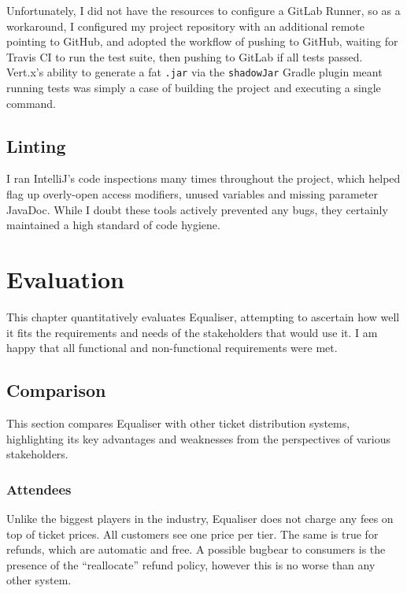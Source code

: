 \documentclass[12pt,a4paper]{bhamdissertation}
\newcommand{\code}[1]{\texttt{#1}}
\begin{document}
Unfortunately, I did not have the resources to configure a GitLab Runner, so as a workaround, I configured my project repository with an additional remote pointing to GitHub, and adopted the workflow of pushing to GitHub, waiting for Travis CI to run the test suite, then pushing to GitLab if all tests passed. Vert.x's ability to generate a fat \code{.jar} via the \code{shadowJar} Gradle plugin meant running tests was simply a case of building the project and executing a single command.

\section{Linting}

I ran IntelliJ's code inspections many times throughout the project, which helped flag up overly-open access modifiers, unused variables and missing parameter JavaDoc. While I doubt these tools actively prevented any bugs, they certainly maintained a high standard of code hygiene.

\chapter{Evaluation} \label{evaluation}

This chapter quantitatively evaluates Equaliser, attempting to ascertain how well it fits the requirements and needs of the stakeholders that would use it. I am happy that all functional and non-functional requirements were met.

\section{Comparison}

This section compares Equaliser with other ticket distribution systems, highlighting its key advantages and weaknesses from the perspectives of various stakeholders.

\subsection{Attendees}

Unlike the biggest players in the industry, Equaliser does not charge any fees on top of ticket prices. All customers see one price per tier. The same is true for refunds, which are automatic and free. A possible bugbear to consumers is the presence of the ``reallocate'' refund policy, however this is no worse than any other system.
\end{document}
